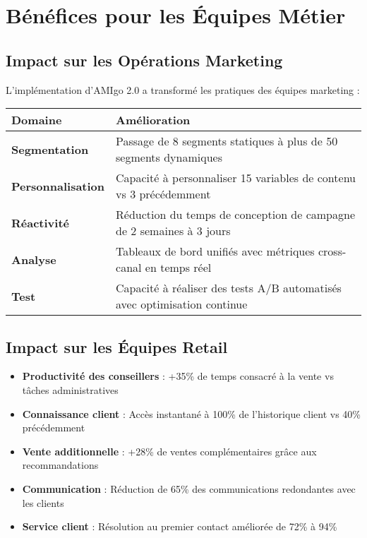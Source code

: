 \section{Bénéfices pour les Équipes Métier}

\subsection{Impact sur les Opérations Marketing}

L'implémentation d'AMIgo 2.0 a transformé les pratiques des équipes marketing :

\begin{center}
\begin{tabular}{|>{\bfseries}p{4cm}|p{9.5cm}|}
\hline
\rowcolor{lightblue} Domaine & Amélioration \\
\hline
Segmentation & Passage de 8 segments statiques à plus de 50 segments dynamiques \\
\hline
Personnalisation & Capacité à personnaliser 15 variables de contenu vs 3 précédemment \\
\hline
Réactivité & Réduction du temps de conception de campagne de 2 semaines à 3 jours \\
\hline
Analyse & Tableaux de bord unifiés avec métriques cross-canal en temps réel \\
\hline
Test & Capacité à réaliser des tests A/B automatisés avec optimisation continue \\
\hline
\end{tabular}
\end{center}

\subsection{Impact sur les Équipes Retail}

\begin{itemize}
    \item \textbf{Productivité des conseillers} : +35\% de temps consacré à la vente vs tâches administratives
    \item \textbf{Connaissance client} : Accès instantané à 100\% de l'historique client vs 40\% précédemment
    \item \textbf{Vente additionnelle} : +28\% de ventes complémentaires grâce aux recommandations
    \item \textbf{Communication} : Réduction de 65\% des communications redondantes avec les clients
    \item \textbf{Service client} : Résolution au premier contact améliorée de 72\% à 94\%
\end{itemize}

